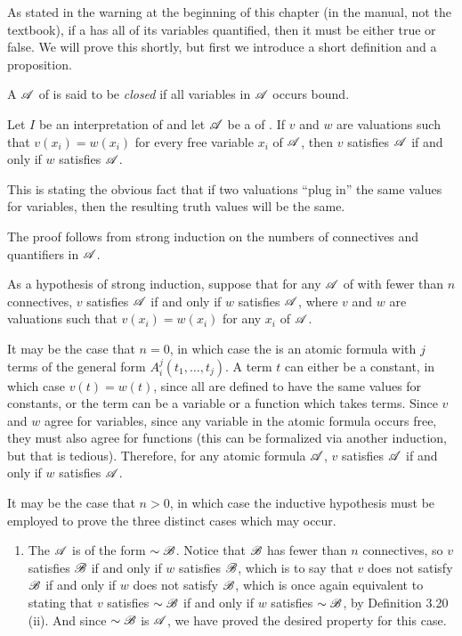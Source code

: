 As stated in the warning at the beginning of this chapter (in the manual, not the textbook), if a \wf{} has all of its variables quantified, then it must be either true or false. We will prove this shortly, but first we introduce a short definition and a proposition.

\begin{definition}
  A \wf{} \(\mathscr{A}\) of \cl{} is said to be \textit{closed} if all variables in \(\mathscr{A}\) occurs bound.
\end{definition}

\begin{proposition}
  Let \(I\) be an interpretation of \cl{} and let \(\mathscr{A}\) be a \wf{} of \cl{}. If \(v\) and \(w\) are valuations such that \(v(x_i) = w(x_i)\) for every free variable \(x_i\) of \(\mathscr{A}\), then \(v\) satisfies \(\mathscr{A}\) if and only if \(w\) satisfies \(\mathscr{A}\).

  \note{} This is stating the obvious fact that if two valuations ``plug in'' the same values for variables, then the resulting truth values will be the same.

  \prf{} The proof follows from strong induction on the numbers of connectives and quantifiers in \(\mathscr{A}\).

  As a hypothesis of strong induction, suppose that for any \wf{} \(\mathscr{A}\) of \cl{} with fewer than \(n\) connectives, \(v\) satisfies \(\mathscr{A}\) if and only if \(w\) satisfies \(\mathscr{A}\), where \(v\) and \(w\) are valuations such that \(v(x_i) = w(x_i)\) for any \(x_i\) of \(\mathscr{A}\).

  It may be the case that \(n = 0\), in which case the \wf{} is an atomic formula with \(j\) terms of the general form \(A^j_i(t_1, \dots, t_j)\). A term \(t\) can either be a constant, in which case \(v(t) = w(t)\), since all are defined to have the same values for constants, or the term can be a variable or a function which takes terms. Since \(v\) and \(w\) agree for variables, since any variable in the atomic formula occurs free, they must also agree for functions (this can be formalized via another induction, but that is tedious). Therefore, for any atomic formula \(\mathscr{A}\), \(v\) satisfies \(\mathscr{A}\) if and only if \(w\) satisfies \(\mathscr{A}\).

  It may be the case that \(n > 0\), in which case the inductive hypothesis must be employed to prove the three distinct cases which may occur.
  \begin{enumerate}
    \item The \wf{} \(\mathscr{A}\) is of the form \(\sim\mathscr{B}\). Notice that \(\mathscr{B}\) has fewer than \(n\) connectives, so \(v\) satisfies \(\mathscr{B}\) if and only if \(w\) satisfies \(\mathscr{B}\), which is to say that \(v\) does not satisfy \(\mathscr{B}\) if and only if \(w\) does not satisfy \(\mathscr{B}\), which is once again equivalent to stating that \(v\) satisfies \(\sim\mathscr{B}\) if and only if \(w\) satisfies \(\sim\mathscr{B}\), by Definition 3.20 (ii). And since \(\sim\mathscr{B}\) is \(\mathscr{A}\), we have proved the desired property for this case.


\end{enumerate}
\end{proposition}
